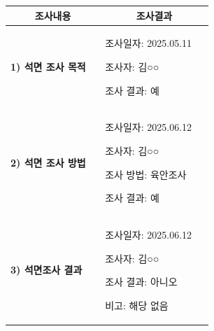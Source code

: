 \documentclass[UTF8,10pt,a4paper,fontset=fandol]{ctexart}
\newcommand{\fieldvalue}[1]{#1}
\newcommand{\handwritten}[1]{#1}
\begin{document}
\vspace{0.5em}

\small
\begin{tabular}{|p{0.42\linewidth}|p{0.48\linewidth}|}
\hline
\multicolumn{1}{|c|}{조사내용} & \multicolumn{1}{c|}{조사결과} \\ \hline

\textbf{1) 석면 조사 목적} &
조사일자:
\fieldvalue{\handwritten{2025.05.11}}

조사자:
\fieldvalue{\handwritten{김○○}}

조사 결과:
\fieldvalue{\handwritten{예}}
\\ \hline

\textbf{2) 석면 조사 방법} &
조사일자:
\fieldvalue{\handwritten{2025.06.12}}

조사자:
\fieldvalue{\handwritten{김○○}}

조사 방법:
\fieldvalue{\handwritten{육안조사}}

조사 결과:
\fieldvalue{\handwritten{예}}
\\ \hline

\textbf{3) 석면조사 결과} &
조사일자:
\fieldvalue{\handwritten{2025.06.12}}

조사자:
\fieldvalue{\handwritten{김○○}}

조사 결과:
\fieldvalue{\handwritten{아니오}}

비고:
\fieldvalue{\handwritten{해당 없음}}
\\ \hline


\end{tabular}
\end{document}
